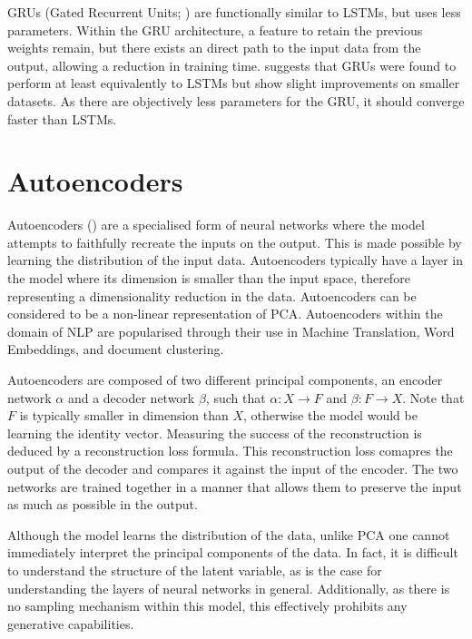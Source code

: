 \documentclass[12pt,twoside]{report}
\begin{document}
GRUs (Gated Recurrent Units; \cite{cho_properties_2014}) are functionally similar to LSTMs, but uses less parameters. Within the GRU architecture, a feature to retain the previous weights remain, but there exists an direct path to the input data from the output, allowing a reduction in training time. \cite{chung_empirical_2014} suggests that GRUs were found to perform at least equivalently to LSTMs but show slight improvements on smaller datasets. As there are objectively less parameters for the GRU, it should converge faster than LSTMs.

\section{Autoencoders}
\label{autoencoders}
Autoencoders (\cite{e._rumelhart_learning_1986}) are a specialised form of neural networks where the model attempts to faithfully recreate the inputs on the output. This is made possible by learning the distribution of the input data. Autoencoders typically have a layer in the model where its dimension is smaller than the input space, therefore representing a dimensionality reduction in the data. Autoencoders can be considered to be a non-linear representation of PCA. Autoencoders within the domain of NLP are popularised through their use in Machine Translation, Word Embeddings, and document clustering. 

Autoencoders are composed of two different principal components, an encoder network $\alpha$ and a decoder network $\beta$, such that $\alpha : X \rightarrow F$ and $\beta : F \rightarrow X$. Note that $F$ is typically smaller in dimension than $X$, otherwise the model would be learning the identity vector.  Measuring the success of the reconstruction is deduced by a reconstruction loss formula. This reconstruction loss comapres the output of the decoder and compares it against the input of the encoder. The two networks are trained together in a manner that allows them to preserve the input as much as possible in the output.


Although the model learns the distribution of the data, unlike PCA one cannot immediately interpret the principal components of the data. In fact, it is difficult to understand the structure of the latent variable, as is the case for understanding the layers of neural networks in general. Additionally, as there is no sampling mechanism within this model, this effectively prohibits any generative capabilities. 
\end{document}
